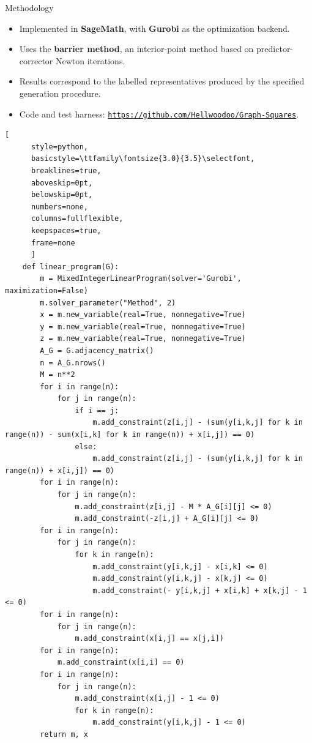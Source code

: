 \documentclass[10pt]{beamer}
\begin{document}
\begin{frame}[fragile]{Methodology}
  \scriptsize
  \begin{itemize}[itemsep=1pt, topsep=1pt, leftmargin=*]
    \item Implemented in \textbf{SageMath}, with \textbf{Gurobi} as the optimization backend.
    \item Uses the \textbf{barrier method}, an interior-point method based on predictor-corrector Newton iterations.
    \item Results correspond to the labelled representatives produced by the specified generation procedure.
    \item Code and test harness: \href{https://github.com/Hellwoodoo/Graph-Squares}{\texttt{https://github.com/Hellwoodoo/Graph-Squares}}.
  \end{itemize}
  \begin{lstlisting}[
      style=python,
      basicstyle=\ttfamily\fontsize{3.0}{3.5}\selectfont,
      breaklines=true,
      aboveskip=0pt,
      belowskip=0pt,
      numbers=none,
      columns=fullflexible,
      keepspaces=true,
      frame=none
      ]
    def linear_program(G):
        m = MixedIntegerLinearProgram(solver='Gurobi', maximization=False)
        m.solver_parameter("Method", 2)
        x = m.new_variable(real=True, nonnegative=True)
        y = m.new_variable(real=True, nonnegative=True)
        z = m.new_variable(real=True, nonnegative=True)
        A_G = G.adjacency_matrix()
        n = A_G.nrows()
        M = n**2
        for i in range(n):
            for j in range(n):
                if i == j:
                    m.add_constraint(z[i,j] - (sum(y[i,k,j] for k in range(n)) - sum(x[i,k] for k in range(n)) + x[i,j]) == 0)
                else:
                    m.add_constraint(z[i,j] - (sum(y[i,k,j] for k in range(n)) + x[i,j]) == 0)
        for i in range(n):
            for j in range(n):
                m.add_constraint(z[i,j] - M * A_G[i][j] <= 0)
                m.add_constraint(-z[i,j] + A_G[i][j] <= 0)
        for i in range(n):
            for j in range(n):
                for k in range(n):
                    m.add_constraint(y[i,k,j] - x[i,k] <= 0)
                    m.add_constraint(y[i,k,j] - x[k,j] <= 0)
                    m.add_constraint(- y[i,k,j] + x[i,k] + x[k,j] - 1 <= 0)
        for i in range(n):
            for j in range(n):
                m.add_constraint(x[i,j] == x[j,i])
        for i in range(n):
            m.add_constraint(x[i,i] == 0)
        for i in range(n):
            for j in range(n):
                m.add_constraint(x[i,j] - 1 <= 0)
                for k in range(n):
                    m.add_constraint(y[i,k,j] - 1 <= 0)
        return m, x
    \end{lstlisting}
\end{frame}
\end{document}
